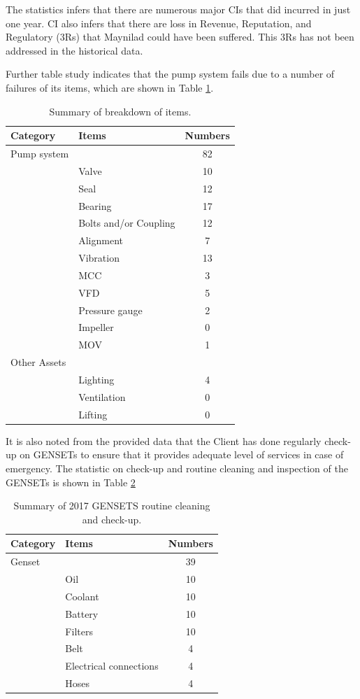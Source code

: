 The statistics infers that there are numerous major CIs that did incurred in just one year. CI also infers that there are loss in Revenue, Reputation, and Regulatory (3Rs) that Maynilad could have been suffered. This 3Rs has not been addressed in the historical data.

Further table study indicates that the pump system fails due to a number of failures of its items, which are shown in Table \ref{ch02_tbl_failure}.

\begin{table}[h]
	\caption{Summary of breakdown of items.}
	\label{ch02_tbl_failure}
	{\footnotesize
\begin{tabular}{l|l|c}
	\hline
	Category & Items & Numbers \\ 
	\hline
	Pump system &  & 82 \\ 
	& Valve & 10 \\ 
	& Seal & 12 \\ 
	& Bearing & 17 \\ 
	& Bolts and/or Coupling & 12 \\ 
	& Alignment & 7 \\ 
	& Vibration & 13 \\ 
	& MCC & 3 \\ 
	& VFD & 5 \\ 
	& Pressure gauge & 2 \\ 
	& Impeller & 0 \\ 
	& MOV & 1 \\ 
	\hline
	Other Assets &  &  \\ 
	& Lighting & 4 \\ 
	& Ventilation & 0 \\ 
	& Lifting & 0 \\ 
	\hline
\end{tabular}
		
	}
\end{table}

It is also noted from the provided data that the Client has done regularly check-up on GENSETs to ensure that it provides adequate level of services in case of emergency. The statistic on check-up and routine cleaning and inspection of the GENSETs is shown in Table \ref{ch02_tbl_gensets}

\begin{table}[h]
	\caption{Summary of 2017 GENSETS routine cleaning and check-up.}
	\label{ch02_tbl_gensets}
	{\footnotesize
\begin{tabular}{l|l|c}
	\hline
	Category & Items & Numbers \\ 
	\hline
	Genset &  & 39 \\ 
	& Oil  & 10 \\ 
	& Coolant & 10 \\ 
	& Battery & 10 \\ 
	& Filters & 10 \\ 
	& Belt & 4 \\ 
	& Electrical connections & 4 \\ 
	& Hoses & 4 \\ 
	\hline
\end{tabular}
	}
\end{table}


